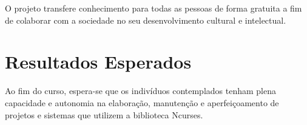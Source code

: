 \documentclass[a4paper,10pt]{article} %
\begin{document}
O projeto transfere conhecimento para todas as pessoas de forma gratuita a fim de colaborar com a sociedade no seu desenvolvimento cultural e intelectual.


\section{Resultados Esperados}
Ao fim do curso, espera-se que os indivíduos contemplados tenham plena capacidade e autonomia na elaboração, manutenção e aperfeiçoamento de  projetos e sistemas que utilizem a biblioteca Ncurses.


\nocite{*}


%



\end{document}
